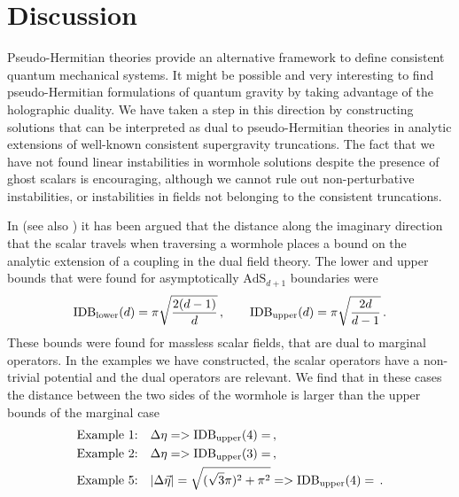 \section{Discussion}\label{sec:discuss}

Pseudo-Hermitian theories provide an alternative framework to define consistent quantum mechanical systems.
It might be possible and very interesting to find pseudo-Hermitian formulations of quantum gravity by taking advantage of the holographic duality.
We have taken a step in this direction by constructing solutions that can be interpreted as dual to pseudo-Hermitian theories in analytic extensions of well-known consistent supergravity truncations.
The fact that we have not found linear instabilities in wormhole solutions despite the presence of ghost scalars is encouraging, although we cannot rule out non-perturbative instabilities, or instabilities in fields not belonging to the consistent truncations. 

In \cite{Maldacena:2026jqd} (see also \cite{DiUbaldo:2026rly,Etheredge:2026rio}) it has been argued that the distance along the imaginary direction that the scalar travels when traversing a wormhole places a bound on the analytic extension of a coupling in the dual field theory.
The lower and upper bounds that were found for asymptotically $\text{AdS}_{d+1}$ boundaries were
\begin{equation}
	\text{IDB}_{\text{lower}}(d)
	=
	\pi \sqrt{\frac{2(d-1)}{d}}
	\,, \qquad 
	\text{IDB}_{\text{upper}}(d)
	=
	\pi \sqrt{\frac{2d}{d-1}}\,.
\end{equation}
These bounds were found for massless scalar fields, that are dual to marginal operators.
In the examples we have constructed, the scalar operators have a non-trivial potential and the dual operators are relevant.
We find that in these cases the distance between the two sides of the wormhole is larger than the upper bounds of the marginal case
\begin{align}
\text{Example 1:}\quad& \Delta \eta=> \text{IDB}_{\text{upper}}(4)=
\,,\\
\text{Example 2:}\quad& \Delta \eta=> \text{IDB}_{\text{upper}}(3)=
\,,\\
\text{Example 5:}\quad& |\Delta \vec \eta|= \sqrt{(\sqrt{3}\pi)^2+\pi^2} =  > \text{IDB}_{\text{upper}}(4)=\,.
\end{align}

